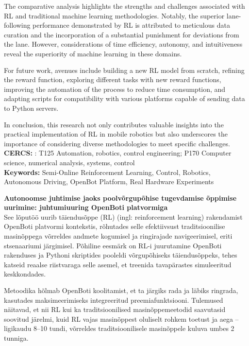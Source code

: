 \documentclass[12pt]{report}
\begin{document}
The comparative analysis highlights the strengths and challenges associated with RL and traditional machine learning methodologies. Notably, the superior lane-following performance demonstrated by RL is attributed to meticulous data curation and the incorporation of a substantial punishment for deviations from the lane. However, considerations of time efficiency, autonomy, and intuitiveness reveal the superiority of machine learning in these domains.

For future work, avenues include building a new RL model from scratch, refining the reward function, exploring different tasks with new reward functions, improving the automation of the process to reduce time consumption, and adapting scripts for compatibility with various platforms capable of sending data to Python servers.

In conclusion, this research not only contributes valuable insights into the practical implementation of RL in mobile robotics but also underscores the importance of considering diverse methodologies to meet specific challenges. 
\\[5mm]
\textbf{CERCS:} : T125 Automation, robotics, control engineering;  P170 Computer science, numerical analysis, systems, control
\\[5mm]
\textbf{Keywords:} Semi-Online Reinforcement Learning, Control, Robotics, Autonomous Driving, OpenBot Platform, Real Hardware Experiments

\newpage
\noindent \textbf{Autonoomse juhtimise jaoks poolvõrgupõhise tugevdamise õppimise uurimine: juhtumiuuring OpenBoti platvormiga}
\\[5mm]

\noindent See lõputöö uurib täiendusõppe (RL) (ingl: reinforcement learning) rakendamist OpenBoti platvormi kontekstis, rõhutades selle efektiivsust traditsioonilise masinõppega võrreldes andmete kogumisel ja ringirajade navigeerimisel, eriti stsenaariumi järgimisel. Põhiline eesmärk on RL-i juurutamine OpenBoti rakenduses ja Pythoni skriptides pooleldi võrgupõhiseks täiendusõppeks, tehes katseid reaalse riistvaraga selle asemel, et treenida tavapärastes simuleeritud keskkondades.

Metoodika hõlmab OpenBoti koolitamist, et ta järgiks rada ja läbiks ringrada, kasutades maksimeerimiseks integreeritud preemiafunktsiooni. Tulemused näitavad, et nii RL kui ka traditsioonilised masinõppemeetodid saavutasid soovitud järelmi, kuid RL vajas masinõppest oluliselt rohkem toetust ja aega – ligikaudu 8–10 tundi, võrreldes traditsioonilisele masinõppele
kuluva umbes 2 tunniga.
\end{document}

